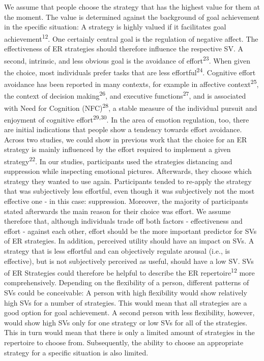 \documentclass[
  man,floatsintext]{apa6}
\begin{document}
We assume that people choose the strategy that has the highest value for them at the moment.
The value is determined against the background of goal achievement in the specific situation: A strategy is highly valued if it facilitates goal achievement\textsuperscript{12}.
One certainly central goal is the regulation of negative affect.
The effectiveness of ER strategies should therefore influence the respective SV.
A second, intrinsic, and less obvious goal is the avoidance of effort\textsuperscript{23}.
When given the choice, most individuals prefer tasks that are less effortful\textsuperscript{24}.
Cognitive effort avoidance has been reported in many contexts, for example in affective context\textsuperscript{25}, the context of decision making\textsuperscript{26}, and executive functions\textsuperscript{27}, and is associated with Need for Cognition (NFC)\textsuperscript{28}, a stable measure of the individual pursuit and enjoyment of cognitive effort\textsuperscript{29,30}.
In the area of emotion regulation, too, there are initial indications that people show a tendency towards effort avoidance.
Across two studies, we could show in previous work that the choice for an ER strategy is mainly influenced by the effort required to implement a given strategy\textsuperscript{22}.
In our studies, participants used the strategies distancing and suppression while inspecting emotional pictures.
Afterwards, they choose which strategy they wanted to use again.
Participants tended to re-apply the strategy that was subjectively less effortful, even though it was subjectively not the most effective one - in this case: suppression.
Moreover, the majority of participants stated afterwards the main reason for their choice was effort.
We assume therefore that, although individuals trade off both factors - effectiveness and effort - against each other, effort should be the more important predictor for SVs of ER strategies.
In addition, perceived utility should have an impact on SVs.
A strategy that is less effortful and can objectively regulate arousal (i.e., is effective), but is not subjectively perceived as useful, should have a low SV.
SVs of ER Strategies could therefore be helpful to describe the ER repertoire\textsuperscript{12} more comprehensively.
Depending on the flexibility of a person, different patterns of SVs could be conceivable: A person with high flexibility would show relatively high SVs for a number of strategies.
This would mean that all strategies are a good option for goal achievement.
A second person with less flexibility, however, would show high SVs only for one strategy or low SVs for all of the strategies.
This in turn would mean that there is only a limited amount of strategies in the repertoire to choose from.
Subsequently, the ability to choose an appropriate strategy for a specific situation is also limited.
\end{document}
